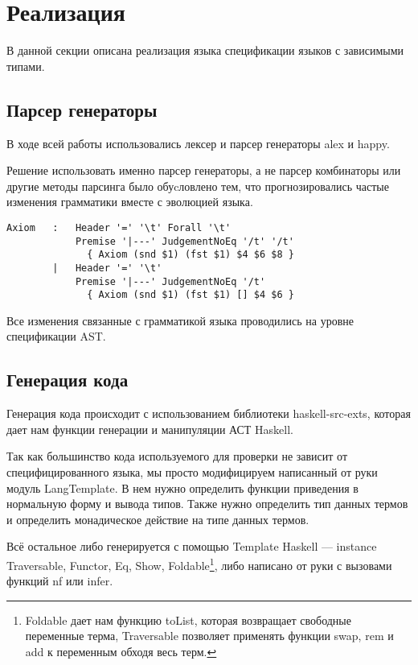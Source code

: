 \section{Реализация}
В данной секции описана реализация языка спецификации языков с зависимыми типами.

\subsection{Парсер генераторы}
В ходе всей работы использовались лексер и парсер генераторы alex\cite{alex} и happy\cite{happy}.

Решение использовать именно парсер генераторы, а не парсер комбинаторы\cite{parsec} или другие методы парсинга было обуcловлено тем, что прогнозировались частые изменения грамматики вместе с эволюцией языка.

\begin{lstlisting}[caption={Часть спецификации парсера},captionpos=b]
Axiom   :   Header '=' '\t' Forall '\t'
            Premise '|---' JudgementNoEq '/t' '/t'
              { Axiom (snd $1) (fst $1) $4 $6 $8 }
        |   Header '=' '\t'
            Premise '|---' JudgementNoEq '/t'
              { Axiom (snd $1) (fst $1) [] $4 $6 }
\end{lstlisting}

Все изменения связанные с грамматикой языка проводились на уровне спецификации AST.






\subsection{Генерация кода}
Генерация кода происходит с использованием библиотеки haskell-src-exts\cite{src_exts}, которая дает нам функции генерации и манипуляции АСТ Haskell.

Так как большинство кода используемого для проверки не зависит от специфицированного языка, мы просто модифицируем написанный от руки модуль LangTemplate. В нем нужно определить функции приведения в нормальную форму и вывода типов. Также нужно определить тип данных термов и определить монадическое действие на типе данных термов.

Всё остальное либо генерируется с помощью Template Haskell\cite{TH} --- instance Traversable, Functor, Eq, Show, Foldable\footnote{Foldable дает нам функцию toList, которая возвращает свободные переменные терма, Traversable позволяет применять функции swap, rem и add  к переменным обходя весь терм.}, либо написано от руки с вызовами функций nf или infer.

